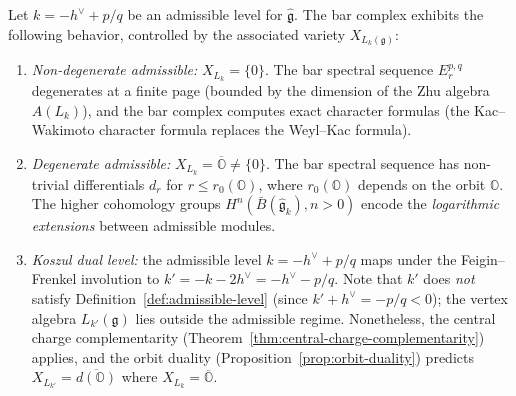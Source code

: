 \begin{proposition}
\label{prop:bar-admissible}
Let $k = -h^\vee + p/q$ be an admissible level for
$\widehat{\mathfrak{g}}$.  The bar complex exhibits the
following behavior, controlled by the associated variety
$X_{L_k(\mathfrak{g})}$\textup{:}
\begin{enumerate}[label=\textup{(\roman*)}]
\item \emph{Non-degenerate admissible:}
  $X_{L_k} = \{0\}$.  The bar spectral sequence
  $E_r^{p,q}$ degenerates at a finite page (bounded by the
  dimension of the Zhu algebra $A(L_k)$), and the bar complex
  computes exact character formulas (the Kac--Wakimoto character
  formula replaces the Weyl--Kac formula).
\item \emph{Degenerate admissible:}
  $X_{L_k} = \overline{\mathbb{O}} \neq \{0\}$.  The bar
  spectral sequence has non-trivial differentials $d_r$ for
  $r \leq r_0(\mathbb{O})$, where $r_0(\mathbb{O})$ depends on
  the orbit $\mathbb{O}$.  The higher cohomology groups
  $H^n(\bar{B}(\widehat{\mathfrak{g}}_k), n > 0)$ encode
  the \emph{logarithmic extensions} between admissible modules.
\item \emph{Koszul dual level:} the admissible level
  $k = -h^\vee + p/q$ maps under the Feigin--Frenkel involution to
  $k' = -k - 2h^\vee = -h^\vee - p/q$.  Note that $k'$ does
  \emph{not} satisfy Definition~\textup{\ref{def:admissible-level}}
  (since $k' + h^\vee = -p/q < 0$); the vertex algebra
  $L_{k'}(\mathfrak{g})$ lies outside the admissible regime.
  Nonetheless, the central charge complementarity
  (Theorem~\textup{\ref{thm:central-charge-complementarity}})
  applies, and the orbit duality
  (Proposition~\textup{\ref{prop:orbit-duality}}) predicts
  $X_{L_{k'}} = \overline{d(\mathbb{O})}$ where
  $X_{L_k} = \overline{\mathbb{O}}$.
\end{enumerate}
\end{proposition}

